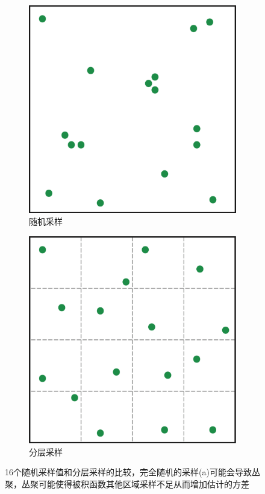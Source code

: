 \begin{figure}
\sidecaption
	{\begin{subfigure}[b]{0.3\textwidth}
		\includegraphics[width=1.\textwidth]{figures/mc/mc-12-1}
		\caption{随机采样}
	\end{subfigure}
	\begin{subfigure}[b]{0.3\textwidth}
		\includegraphics[width=1.\textwidth]{figures/mc/mc-12-2}
		\caption{分层采样}
	\end{subfigure}}
	\caption{16个随机采样值和分层采样的比较，完全随机的采样(a)可能会导致丛聚，丛聚可能使得被积函数其他区域采样不足从而增加估计的方差}
	\label{f:placement}
\end{figure}


